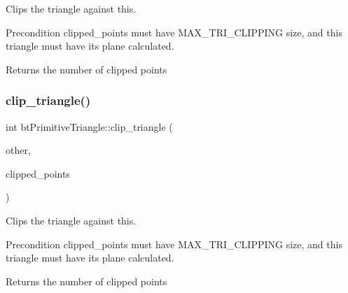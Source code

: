 Clips the triangle against this. 

\begin{DoxyPrecond}{Precondition}
clipped\+\_\+points must have M\+A\+X\+\_\+\+T\+R\+I\+\_\+\+C\+L\+I\+P\+P\+I\+NG size, and this triangle must have its plane calculated. 
\end{DoxyPrecond}
\begin{DoxyReturn}{Returns}
the number of clipped points 
\end{DoxyReturn}
\mbox{\label{classbtPrimitiveTriangle_a56e930410f18f866e47431ed77c6c3ca}} 
\subsubsection{\texorpdfstring{clip\+\_\+triangle()}{clip\_triangle()}\hspace{0.1cm}{\footnotesize\ttfamily [2/2]}}
{\footnotesize\ttfamily int bt\+Primitive\+Triangle\+::clip\+\_\+triangle (\begin{DoxyParamCaption}\item[{\hyperlink{classbtPrimitiveTriangle}{bt\+Primitive\+Triangle} \&}]{other,  }\item[{bt\+Vector3 $\ast$}]{clipped\+\_\+points }\end{DoxyParamCaption})}



Clips the triangle against this. 

\begin{DoxyPrecond}{Precondition}
clipped\+\_\+points must have M\+A\+X\+\_\+\+T\+R\+I\+\_\+\+C\+L\+I\+P\+P\+I\+NG size, and this triangle must have its plane calculated. 
\end{DoxyPrecond}
\begin{DoxyReturn}{Returns}
the number of clipped points 
\end{DoxyReturn}
\mbox{\label{classbtPrimitiveTriangle_a24c4903aecd95c2d11bbc42ba3df0e66}} 
